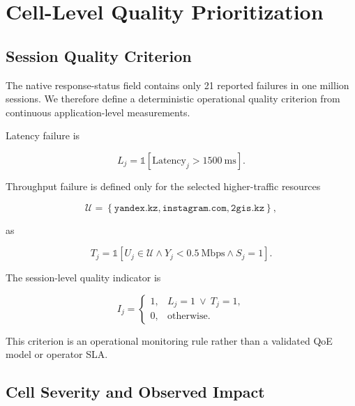 \documentclass[conference]{IEEEtran}
\begin{document}
\section{Cell-Level Quality Prioritization}

\subsection{Session Quality Criterion}

The native response-status field contains only 21 reported failures in one million sessions. We therefore define a deterministic operational quality criterion from continuous application-level measurements.

Latency failure is

\begin{equation}
L_j =
\mathbb{1}
\left[
\mathrm{Latency}_j
>
1500\ \mathrm{ms}
\right].
\end{equation}

Throughput failure is defined only for the selected higher-traffic resources

\begin{equation}
\mathcal{U}
=
\left\{
\texttt{yandex.kz},
\texttt{instagram.com},
\texttt{2gis.kz}
\right\},
\end{equation}

as

\begin{equation}
T_j =
\mathbb{1}
\left[
U_j\in\mathcal{U}
\land
Y_j<0.5\ \mathrm{Mbps}
\land
S_j=1
\right].
\end{equation}

The session-level quality indicator is

\begin{equation}
I_j =
\begin{cases}
1, & L_j=1\ \lor\ T_j=1,\\
0, & \text{otherwise}.
\end{cases}
\end{equation}

This criterion is an operational monitoring rule rather than a validated QoE model or operator SLA.

\subsection{Cell Severity and Observed Impact}
\end{document}
